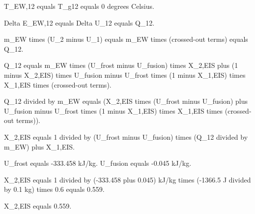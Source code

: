 T_EW,12 equals T_g12 equals 0 degrees Celsius.  

Delta E_EW,12 equals Delta U_12 equals Q_12.  

m_EW times (U_2 minus U_1) equals m_EW times (crossed-out terms) equals Q_12.  

Q_12 equals m_EW times (U_frost minus U_fusion) times X_2,EIS plus (1 minus X_2,EIS) times U_fusion minus U_frost times (1 minus X_1,EIS) times X_1,EIS times (crossed-out terms).  

Q_12 divided by m_EW equals (X_2,EIS times (U_frost minus U_fusion) plus U_fusion minus U_frost times (1 minus X_1,EIS) times X_1,EIS times (crossed-out terms)).  

X_2,EIS equals 1 divided by (U_frost minus U_fusion) times (Q_12 divided by m_EW) plus X_1,EIS.  

U_frost equals -333.458 kJ/kg.  
U_fusion equals -0.045 kJ/kg.  

X_2,EIS equals 1 divided by (-333.458 plus 0.045) kJ/kg times (-1366.5 J divided by 0.1 kg) times 0.6 equals 0.559.  

X_2,EIS equals 0.559.